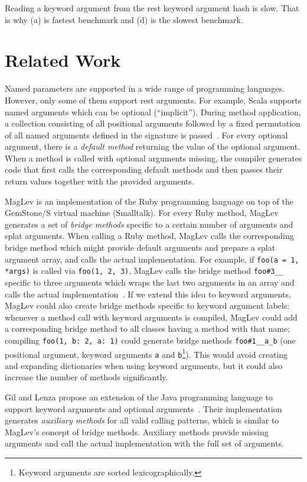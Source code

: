 \documentclass{sigplanconf} %
\begin{document}
Reading a keyword argument from the rest keyword argument hash is slow. That is why (a) is fastest benchmark and (d) is the slowest benchmark.

\section{Related Work}
Named parameters are supported in a wide range of programming languages. However, only some of them support rest arguments. For example, Scala supports named arguments which can be optional (``implicit''). During method application, a collection consisting of all positional arguments followed by a fixed permutation of all named arguments defined in the signature is passed~\cite{Rytz:2010:NDA:1774088.1774529}. For every optional argument, there is a \emph{default method} returning the value of the optional argument. When a method is called with optional arguments missing, the compiler generates code that first calls the corresponding default methods and then passes their return values together with the provided arguments.

MagLev is an implementation of the Ruby programming language on top of the GemStone/S virtual machine (Smalltalk). For every Ruby method, MagLev generates a set of \emph{bridge methods} specific to a certain number of arguments and splat arguments. When calling a Ruby method, MagLev calls the corresponding bridge method which might provide default arguments and prepare a splat argument array, and calls the actual implementation. For example, if \lstinline{foo(a = 1, *args)} is called via \lstinline{foo(1, 2, 3)}, MagLev calls the bridge method \lstinline{foo#3__} specific to three arguments which wraps the last two arguments in an array and calls the actual implementation~\cite{SprBachelor}. If we extend this idea to keyword arguments, MagLev could also create bridge methods specific to keyword argument labels: whenever a method call with keyword arguments is compiled, MagLev could add a corresponding bridge method to all classes having a method with that name; \eg compiling \lstinline{foo(1, b: 2, a: 1)} could generate bridge methods \lstinline{foo#1__a_b} (one positional argument, keyword arguments \lstinline{a} and \lstinline{b}\footnote{Keyword arguments are sorted lexicographically.}). This would avoid creating and expanding dictionaries when using keyword arguments, but it could also increase the number of methods significantly.

Gil and Lenza propose an extension of the Java programming language to support keyword arguments and optional arguments~\cite{JOT:issue_2012_04/article1}. Their implementation generates \emph{auxiliary methods} for all valid calling patterns, which is similar to MagLev's concept of bridge methods. Auxiliary methods provide missing arguments and call the actual implementation with the full set of arguments.
\end{document}
